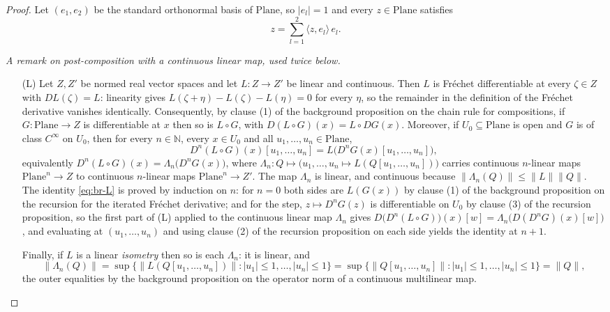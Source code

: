 \begin{proof}
Let $(e_1,e_2)$ be the standard orthonormal basis of $\mathrm{Plane}$, so $\lvert e_l\rvert=1$
and every $z\in\mathrm{Plane}$ satisfies
\begin{equation}\label{eq:br-split}
  z=\sum_{l=1}^{2}\langle z,e_l\rangle\,e_l .
\end{equation}

\medskip\noindent\emph{A remark on post-composition with a continuous linear map, used twice
below.}
\begin{itemize}
\item[(L)] Let $Z,Z'$ be normed real vector spaces and let $L\colon Z\to Z'$ be linear and
continuous.  Then $L$ is Fr\'echet differentiable at every $\zeta\in Z$ with $DL(\zeta)=L$:
linearity gives $L(\zeta+\eta)-L(\zeta)-L(\eta)=0$ for every $\eta$, so the remainder in the
definition of the Fr\'echet derivative vanishes identically.  Consequently, by clause (1) of the
background proposition on the chain rule for compositions, if $G\colon\mathrm{Plane}\to Z$ is
differentiable at $x$ then so is $L\circ G$, with $D(L\circ G)(x)=L\circ DG(x)$.  Moreover, if
$U_0\subseteq\mathrm{Plane}$ is open and $G$ is of class $C^{\infty}$ on $U_0$, then for every
$n\in\mathbb{N}$, every $x\in U_0$ and all $u_1,\ldots,u_n\in\mathrm{Plane}$,
\begin{equation}\label{eq:br-L}
  D^{n}(L\circ G)(x)[u_1,\ldots,u_n]=L\bigl(D^{n}G(x)[u_1,\ldots,u_n]\bigr),
\end{equation}
equivalently $D^{n}(L\circ G)(x)=\Lambda_n\bigl(D^{n}G(x)\bigr)$, where
$\Lambda_n\colon Q\mapsto\bigl(u_1,\ldots,u_n\mapsto L(Q[u_1,\ldots,u_n])\bigr)$ carries
continuous $n$-linear maps $\mathrm{Plane}^{n}\to Z$ to continuous $n$-linear maps
$\mathrm{Plane}^{n}\to Z'$.  The map $\Lambda_n$ is linear, and continuous because
$\lVert\Lambda_n(Q)\rVert\le\lVert L\rVert\lVert Q\rVert$.  The identity
\eqref{eq:br-L} is proved by induction on $n$: for $n=0$ both sides are $L(G(x))$ by clause (1)
of the background proposition on the recursion for the iterated Fr\'echet derivative; and for the
step, $z\mapsto D^{n}G(z)$ is differentiable on $U_0$ by clause (3) of the recursion proposition,
so the first part of (L) applied to the continuous linear map $\Lambda_n$ gives
$D\bigl(D^{n}(L\circ G)\bigr)(x)[w]=\Lambda_n\bigl(D(D^{n}G)(x)[w]\bigr)$, and evaluating at
$(u_1,\ldots,u_n)$ and using clause (2) of the recursion proposition on each side yields the
identity at $n+1$.

Finally, if $L$ is a linear \emph{isometry} then so is each $\Lambda_n$: it is linear, and
\[
  \lVert\Lambda_n(Q)\rVert
  =\sup\{\lVert L(Q[u_1,\ldots,u_n])\rVert:\lvert u_1\rvert\le1,\ldots,\lvert u_n\rvert\le1\}
  =\sup\{\lVert Q[u_1,\ldots,u_n]\rVert:\lvert u_1\rvert\le1,\ldots,\lvert u_n\rvert\le1\}
  =\lVert Q\rVert ,
\]
the outer equalities by the background proposition on the operator norm of a continuous
multilinear map.
\end{itemize}


\end{proof}
